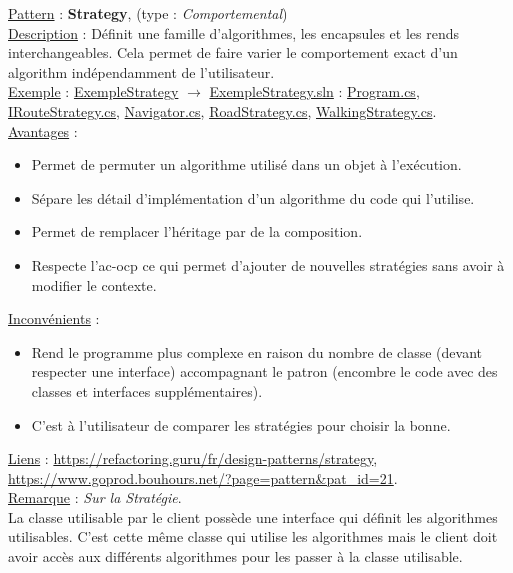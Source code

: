 \documentclass[a4paper,12pt,twoside]{article}
\newcommand{\exemplepath}{../Exercices}
\newcommand{\urlcolor}{magenta}  %
\newcommand{\foldercolor}{orange} %
\newcommand{\cscolor}{green!60!black} %
\newcommand{\slncolor}{violet} %
\newcommand{\rem}[2]{\noindent\underline{Remarque} : \textit{#1}.\\ \indent #2}
\newcommand{\csref}[2]{\hypersetup{urlcolor=\cscolor}\href{file:\exemplepath /#1.cs}{#2.cs}\hypersetup{urlcolor=\urlcolor}}
\newcommand{\slnref}[2]{\hypersetup{urlcolor=\slncolor}\href{file:\exemplepath /#1.sln}{#2.sln}\hypersetup{urlcolor=\urlcolor}}
\newcommand{\folderref}[2]{\hypersetup{urlcolor=\foldercolor}\href{file:\exemplepath /#1/.}{#2}\hypersetup{urlcolor=\urlcolor}}
\newcommand{\dpat}[7]{
\noindent \underline{Pattern} : \textbf{#1}, \indent (type : \textit{#2}) \\
\underline{Description} : \indent #3 \\
\underline{Exemple} : \indent #4 \\
\noindent \underline{Avantages} : 
\begin{itemize}
 #5
\end{itemize}
\noindent \underline{Inconvénients} : 
\begin{itemize}
 #6 
\end{itemize}
\underline{Liens} : #7 
}
\begin{document}
\dpat{Strategy}
{Comportemental}
{Définit une famille d'algorithmes, les encapsules et les rends interchangeables. Cela permet de faire varier le comportement exact d'un algorithm indépendamment de l'utilisateur.}
{\folderref{ExempleStrategy}{ExempleStrategy} $\to$ \slnref{ExempleStrategy/ExempleStrategy}{ExempleStrategy} : \indent \csref{ExempleStrategy/ExempleStrategy/Program}{Program}, \csref{ExempleStrategy/ExempleStrategy/IRouteStrategy}{IRouteStrategy}, \csref{ExempleStrategy/ExempleStrategy/Navigator}{Navigator}, \csref{ExempleStrategy/ExempleStrategy/RoadStrategy}{RoadStrategy}, \csref{ExempleStrategy/ExempleStrategy/WalkingStrategy}{WalkingStrategy}.}
{\item Permet de permuter un algorithme utilisé dans un objet à l'exécution.
\item Sépare les détail d'implémentation d'un algorithme du code qui l'utilise. 
\item Permet de remplacer l'héritage par de la composition.
\item Respecte l'\gls{ac-ocp} ce qui permet d'ajouter de nouvelles stratégies sans avoir à modifier le contexte.}
{\item Rend le programme plus complexe en raison du nombre de classe (devant respecter une interface) accompagnant le patron (encombre le code avec des classes et interfaces supplémentaires).
\item C'est à l'utilisateur de comparer les stratégies pour choisir la bonne.}
{\url{https://refactoring.guru/fr/design-patterns/strategy}, \\ \url{https://www.goprod.bouhours.net/?page=pattern&pat_id=21}.}\\

\rem{Sur la Stratégie}{La classe utilisable par le client possède une interface qui définit les algorithmes utilisables. C'est cette même classe qui utilise les algorithmes mais le client doit avoir accès aux différents algorithmes pour les passer à la classe utilisable.}\\
\end{document}
